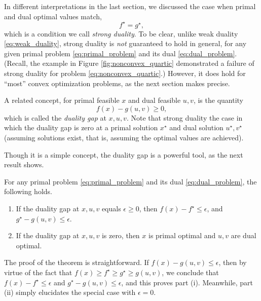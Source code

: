 In different interpretations in the last section, we discussed the case when
primal and dual optimal values match,   
\begin{equation}
\label{eq:strong_duality}
f^\star = g^\star,
\end{equation}
which is a condition we call \emph{strong duality}. To be clear, unlike weak
duality \eqref{eq:weak_duality}, strong duality is \emph{not} guaranteed to hold
in general, for any given primal problem \eqref{eq:primal_problem} and its dual  
\eqref{eq:dual_problem}. (Recall, the example in Figure
\ref{fig:nonconvex_quartic} demonstrated a failure of strong duality for problem
\eqref{eq:nonconvex_quartic}.) However, it does hold for ``most'' convex
optimization problems, as the next section makes precise. 

A related concept, for primal feasible $x$ and dual feasible $u,v$, is the
quantity  
\begin{equation}
\label{eq:duality_gap}
f(x) - g(u,v) \geq 0,
\end{equation}
which is called the \emph{duality gap} at $x,u,v$. Note that strong duality the
case in which the duality gap is zero at a primal solution $x^\star$ and dual
solution $u^\star, v^\star$ (assuming solutions exist, that is, assuming the
optimal values are achieved).  

Though it is a simple concept, the duality gap is a powerful tool, as the next
result shows.

\begin{Theorem}
\label{thm:duality_gap}
For any primal problem \eqref{eq:primal_problem} and its dual
\eqref{eq:dual_problem}, the following holds. 

\begin{enumerate}[label=(\roman*)]
\item If the duality gap at $x,u,v$ equals $\epsilon \geq 0$, then $f(x) -
  f^\star \leq \epsilon$, and $g^\star - g(u,v) \leq \epsilon$.  

\item If the duality gap at $x,u,v$ is zero, then $x$ is primal optimal and
  $u,v$ are dual optimal. 
\end{enumerate}
\end{Theorem}

The proof of the theorem is straightforward. If $f(x) - g(u,v) \leq \epsilon$, 
then by virtue of the fact that $f(x) \geq f^\star \geq g^\star \geq g(u,v)$, we
conclude that $f(x) - f^\star \leq \epsilon$ and $g^\star - g(u,v) \leq
\epsilon$, and this proves part (i). Meanwhile, part (ii) simply elucidates the  
special case with $\epsilon = 0$.

